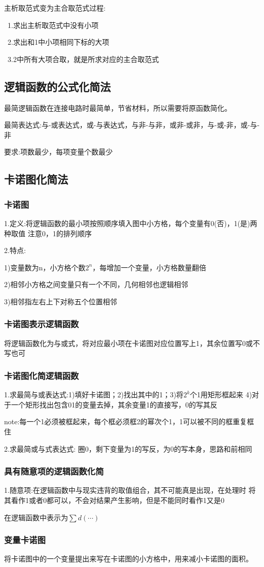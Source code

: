 \documentclass[11pt,twoside,a4paper]{ctexart}
\begin{document}
    主析取范式变为主合取范式过程:

    \ 1.求出主析取范式中没有小项

    \ 2.求出和1中小项相同下标的大项

    \ 3.2中所有大项合取，就是所求对应的主合取范式
    \subsection{逻辑函数的公式化简法}
    最简逻辑函数在连接电路时最简单，节省材料，所以需要将原函数简化。

    最简表达式:与-或表达式，或-与表达式，与非-与非，或非-或非，与-或-非，或-与-非

    要求:项数最少，每项变量个数最少
    \subsection{卡诺图化简法}
    \subsubsection{卡诺图}
    1.定义:将逻辑函数的最小项按照顺序填入图中小方格，每个变量有0(否)，1(是)两种取值
    注意0，1的排列顺序

    2.特点:
    \begin{minipage}[t]{0.9\linewidth}
        1)变量数为n，小方格个数$2^n$，每增加一个变量，小方格数量翻倍

        2)相邻小方格之间变量只有一个不同，几何相邻也逻辑相邻

        3)相邻指左右上下对称五个位置相邻

    \end{minipage}
    \subsubsection{卡诺图表示逻辑函数}
    将逻辑函数化为与或式，将对应最小项在卡诺图对应位置写上1，其余位置写0或不写也可
    \subsubsection{卡诺图化简逻辑函数}
    1.求最简与或表达式:1)填好卡诺图；2)找出其中的1；3)将$2^k$个1用矩形框起来
    4)对于一个矩形找出包含01的变量去掉，其余变量1的直接写，0的写其反

    note:每一个1必须被框起来，每个框必须框2的幂次个1，1可以被不同的框重复框住

    2.求最简或与式表达式:
    圈0，剩下变量为1的写反，为0的写本身，思路和前相同
    
    \subsubsection{具有随意项的逻辑函数化简}
    1.随意项:在逻辑函数中与现实违背的取值组合，其不可能真是出现，在处理时
    将其看作1或者0都可以，不会对结果产生影响，但是不能同时看作1又是0

    在逻辑函数中表示为$\sum d(\cdots)$

    \subsubsection{变量卡诺图}
    将卡诺图中的一个变量提出来写在卡诺图的小方格中，用来减小卡诺图的面积。
\end{document}
